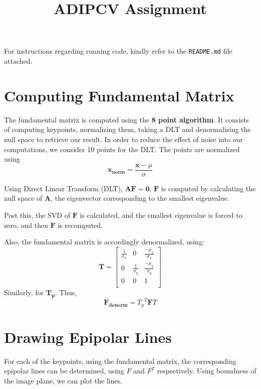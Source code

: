 \documentclass[]{article}
\title{ADIPCV Assignment}
\author{}
\begin{document}
\maketitle

For instructions regarding running code, kindly refer to the \texttt{README.md} file attached.

\section{Computing Fundamental Matrix}
The fundamental matrix is computed using the \textbf{8 point algorithm}. It consists of
computing keypoints, normalizing them, taking a DLT and denormalizing the null space to retrieve our result.
In order to reduce the effect of noise into our computations,
we consider 10 points for the DLT. The points are normalized using
\begin{equation}
  \mathbf{x_{norm}} = \frac{\mathbf{x}-\mu}{\sigma}
\end{equation}

Using Direct Linear Transform (DLT),
$\mathbf{A}\mathbf{F} = \mathbf{0}$. $\mathbf{F}$ is computed
by calculating the null space of $\mathbf{A}$, the
eigenvector corresponding to the smallest eigenvalue.

Post this, the SVD of $\mathbf{F}$ is calculated, and the smallest eigenvalue is forced
to zero, and then $\mathbf{F}$ is recomputed.

Also, the fundamental matrix is accordingly denormalized, using:
\begin{equation}
  \mathbf{T} = 
  \begin{bmatrix}
    \frac{1}{\sigma_x} & 0 & \frac{-\mu_x}{\sigma_x} \\
    0 & \frac{1}{\sigma_y} & \frac{-\mu_y}{\sigma_y} \\
  0 & 0 & 1 \\
  \end{bmatrix}
\end{equation}
Similarly, for $\mathbf{T_p}$. Thus,
\begin{equation}
  \mathbf{F_{denorm}} = {T_p}^{T} \mathbf{F} T 
\end{equation}

\section{Drawing Epipolar Lines}
For each of the keypoints, using the fundamental matrix,
the corresponding epipolar lines can be determined, using $F$ and $F^T$ respectively.
Using boundness of the image plane, we can plot the lines.
\end{document}
